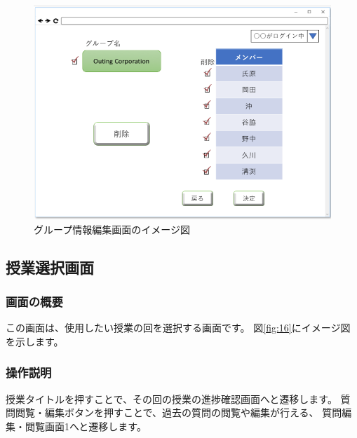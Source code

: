 \begin{figure}[htbp]
  \begin{center}
    \includegraphics[width=1\linewidth,clip]{./img/15.png}
    \caption{グループ情報編集画面のイメージ図}\label{fig:15}
  \end{center}
\end{figure}

\newpage

\subsection{授業選択画面}
\subsubsection{画面の概要}
この画面は、使用したい授業の回を選択する画面です。
図\ref{fig:16}にイメージ図を示します。

\subsubsection{操作説明}
授業タイトルを押すことで、その回の授業の進捗確認画面へと遷移します。
質問閲覧・編集ボタンを押すことで、過去の質問の閲覧や編集が行える、
質問編集・閲覧画面1へと遷移します。


